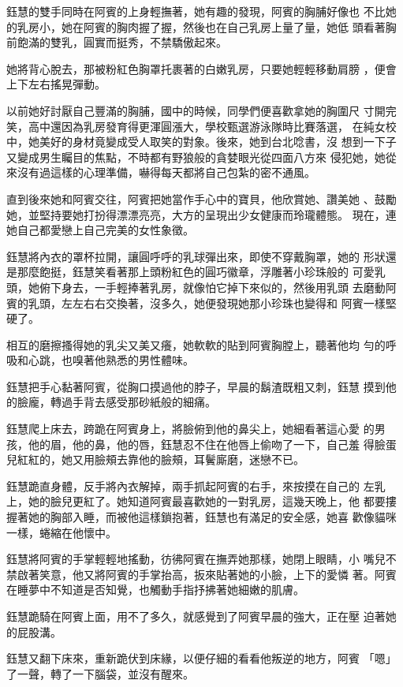 鈺慧的雙手同時在阿賓的上身輕撫著，她有趣的發現，阿賓的胸脯好像也
不比她的乳房小，她在阿賓的胸肉握了握，然後也在自己乳房上量了量，她低
頭看著胸前飽滿的雙乳，圓實而挺秀，不禁驕傲起來。

她將背心脫去，那被粉紅色胸罩托裹著的白嫩乳房，只要她輕輕移動肩膀
，便會上下左右搖晃彈動。

以前她好討厭自己豐滿的胸脯，國中的時候，同學們便喜歡拿她的胸圍尺
寸開完笑，高中還因為乳房發育得更渾圓漲大，學校甄選游泳隊時比賽落選，
在純女校中，她美好的身材竟變成受人取笑的對象。後來，她到台北唸書，沒
想到一下子又變成男生矚目的焦點，不時都有野狼般的貪婪眼光從四面八方來
侵犯她，她從來沒有過這樣的心理準備，嚇得每天都將自己包紮的密不通風。

直到後來她和阿賓交往，阿賓把她當作手心中的寶貝，他欣賞她、讚美她
、鼓勵她，並堅持要她打扮得漂漂亮亮，大方的呈現出少女健康而玲瓏體態。
現在，連她自己都愛戀上自己完美的女性象徵。

鈺慧將內衣的罩杯拉開，讓圓呼呼的乳球彈出來，即使不穿戴胸罩，她的
形狀還是那麼飽挺，鈺慧笑看著那上頭粉紅色的圓巧徽章，浮雕著小珍珠般的
可愛乳頭，她俯下身去，一手輕捧著乳房，就像怕它掉下來似的，然後用乳頭
去磨動阿賓的乳頭，左左右右交換著，沒多久，她便發現她那小珍珠也變得和
阿賓一樣堅硬了。

相互的磨擦搔得她的乳尖又美又癢，她軟軟的貼到阿賓胸膛上，聽著他均
勻的呼吸和心跳，也嗅著他熟悉的男性體味。

鈺慧把手心黏著阿賓，從胸口摸過他的脖子，早晨的鬍渣既粗又刺，鈺慧
摸到他的臉龐，轉過手背去感受那砂紙般的細痛。

鈺慧爬上床去，跨跪在阿賓身上，將臉俯到他的鼻尖上，她細看著這心愛
的男孩，他的眉，他的鼻，他的唇，鈺慧忍不住在他唇上偷吻了一下，自己羞
得臉蛋兒紅紅的，她又用臉頰去靠他的臉頰，耳鬢廝磨，迷戀不已。

鈺慧跪直身體，反手將內衣解掉，兩手抓起阿賓的右手，來按摸在自己的
左乳上，她的臉兒更紅了。她知道阿賓最喜歡她的一對乳房，這幾天晚上，他
都要摟握著她的胸部入睡，而被他這樣鎖抱著，鈺慧也有滿足的安全感，她喜
歡像貓咪一樣，蜷縮在他懷中。

鈺慧將阿賓的手掌輕輕地搖動，彷彿阿賓在撫弄她那樣，她閉上眼睛，小
嘴兒不禁啟著笑意，他又將阿賓的手掌抬高，扳來貼著她的小臉，上下的愛憐
著。阿賓在睡夢中不知道是否知覺，也觸動手指抒拂著她細嫩的肌膚。

鈺慧跪騎在阿賓上面，用不了多久，就感覺到了阿賓早晨的強大，正在壓
迫著她的屁股溝。

鈺慧又翻下床來，重新跪伏到床緣，以便仔細的看看他叛逆的地方，阿賓
「嗯」了一聲，轉了一下腦袋，並沒有醒來。

